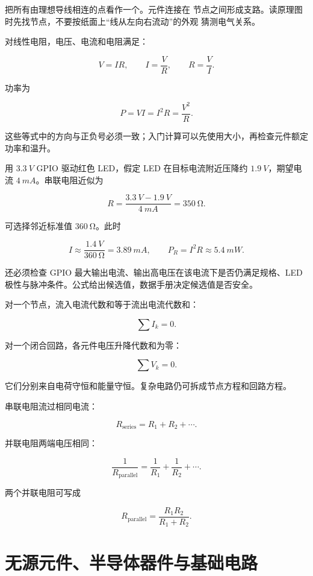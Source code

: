 把所有由理想导线相连的点看作一个。元件连接在
节点之间形成支路。读原理图时先找节点，不要按纸面上“线从左向右流动”的外观
猜测电气关系。

对线性电阻，电压、电流和电阻满足：

\[
V=IR,\qquad I=\frac{V}{R},\qquad R=\frac{V}{I}.
\]

功率为

\[
P=VI=I^2R=\frac{V^2}{R}.
\]

这些等式中的方向与正负号必须一致；入门计算可以先使用大小，再检查元件额定
功率和温升。

\begin{workedexample}
用 \(\SI{3.3}{V}\) GPIO 驱动红色 LED，假定 LED 在目标电流附近压降约
\(\SI{1.9}{V}\)，期望电流 \(\SI{4}{mA}\)。串联电阻近似为

\[
R=\frac{\SI{3.3}{V}-\SI{1.9}{V}}{\SI{4}{mA}}
=\SI{350}{\ohm}.
\]

可选择邻近标准值 \(\SI{360}{\ohm}\)。此时

\[
I\approx\frac{\SI{1.4}{V}}{\SI{360}{\ohm}}
=\SI{3.89}{mA},
\qquad
P_R=I^2R\approx\SI{5.4}{mW}.
\]

还必须检查 GPIO 最大输出电流、输出高电压在该电流下是否仍满足规格、LED
极性与脉冲条件。公式给出候选值，数据手册决定候选值是否安全。
\end{workedexample}

对一个节点，流入电流代数和等于流出电流代数和：

\[
\sum I_k=0.
\]

对一个闭合回路，各元件电压升降代数和为零：

\[
\sum V_k=0.
\]

它们分别来自电荷守恒和能量守恒。复杂电路仍可拆成节点方程和回路方程。

串联电阻流过相同电流：

\[
R_{\mathrm{series}}=R_1+R_2+\cdots.
\]

并联电阻两端电压相同：

\[
\frac{1}{R_{\mathrm{parallel}}}
=\frac{1}{R_1}+\frac{1}{R_2}+\cdots.
\]

两个并联电阻可写成

\[
R_{\mathrm{parallel}}=\frac{R_1R_2}{R_1+R_2}.
\]

\section{无源元件、半导体器件与基础电路}

